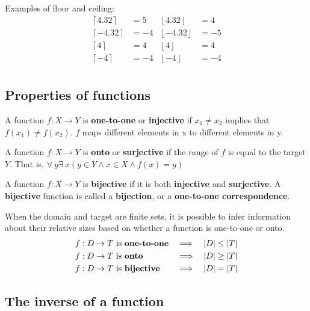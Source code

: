 \noindent Examples of floor and ceiling:
\begin{align*}
  \left\lceil 4.32\right\rceil  & = 5  & \left\lfloor 4.32\right\rfloor  & = 4  \\
  \left\lceil -4.32\right\rceil & = -4 & \left\lfloor -4.32\right\rfloor & = -5 \\
  \left\lceil 4\right\rceil     & = 4  & \left\lfloor 4\right\rfloor     & = 4  \\
  \left\lceil -4\right\rceil    & = -4 & \left\lfloor -4\right\rfloor    & = -4 \\
\end{align*}

\subsection{Properties of functions}

A function $f: X \rightarrow Y$ is \textbf{one-to-one} or \textbf{injective} if $x_1 \not = x_2$ implies that $f(x_1) \not = f(x_2)$.
$f$ maps different elements in x to different elements in y.

A function $f: X \rightarrow Y$ is \textbf{onto} or \textbf{surjective} if the range of $f$ is equal to the target $Y$.
That is, $\forall~ y \exists~ x (y \in Y \land x \in X \land f(x) = y)$

A function $f: X \rightarrow Y$ is \textbf{bijective} if it is both \textbf{injective} and \textbf{surjective}.
A \textbf{bijective} function is called a \textbf{bijection}, or a \textbf{one-to-one correspondence}.

When the domain and target are finite sets, it is possible to infer information about their relative sizes
based on whether a function is one-to-one or onto.
\begin{align*}
  f: D \rightarrow T & \text{ is \textbf{one-to-one}} & \implies &  & \left\lvert D\right\rvert & \leq \left\lvert T\right\rvert \\
  f: D \rightarrow T & \text{ is \textbf{onto}}       & \implies &  & \left\lvert D\right\rvert & \geq \left\lvert T\right\rvert \\
  f: D \rightarrow T & \text{ is \textbf{bijective}}  & \implies &  & \left\lvert D\right\rvert & = \left\lvert T\right\rvert
\end{align*}

\subsection{The inverse of a function}

